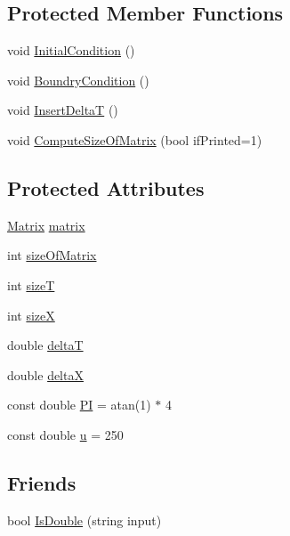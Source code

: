 \subsection*{Protected Member Functions}
\begin{DoxyCompactItemize}
\item 
void \mbox{\hyperlink{class_scheme_ad3546cda995629a2792629a072760ad2}{Initial\+Condition}} ()
\item 
void \mbox{\hyperlink{class_scheme_a36885039937c25f13c8daea654e37b97}{Boundry\+Condition}} ()
\item 
void \mbox{\hyperlink{class_scheme_ac5803e4951dc125b274f543d5037c21d}{Insert\+DeltaT}} ()
\item 
void \mbox{\hyperlink{class_scheme_a0364e328d78e84be15d293a66d946008}{Compute\+Size\+Of\+Matrix}} (bool if\+Printed=1)
\end{DoxyCompactItemize}
\subsection*{Protected Attributes}
\begin{DoxyCompactItemize}
\item 
\mbox{\hyperlink{class_matrix}{Matrix}} \mbox{\hyperlink{class_scheme_a0e1fb8cb7e062d3f49715445a884f0e8}{matrix}}
\item 
int \mbox{\hyperlink{class_scheme_aaa37febfb3b695d7637210b6ffdcd9ad}{size\+Of\+Matrix}}
\item 
int \mbox{\hyperlink{class_scheme_a04f4e41aaa2bffd82b9027550f8374f0}{sizeT}}
\item 
int \mbox{\hyperlink{class_scheme_a34d6e438fa45638221f250c9aa7acde1}{sizeX}}
\item 
double \mbox{\hyperlink{class_scheme_aaaf978f98d30bd96ea56a9387d1b2c5a}{deltaT}}
\item 
double \mbox{\hyperlink{class_scheme_a7491f0ce42370ab44134bf82bd0079a7}{deltaX}}
\item 
const double \mbox{\hyperlink{class_scheme_a1a21e7fac3843f2d64c49597c668ce56}{PI}} = atan(1) $\ast$ 4
\item 
const double \mbox{\hyperlink{class_scheme_a512873bf3cd534832300046f1a1792a3}{u}} = 250
\end{DoxyCompactItemize}
\subsection*{Friends}
\begin{DoxyCompactItemize}
\item 
bool \mbox{\hyperlink{class_scheme_ad9aa7a2eac63a3a91e6efc3d8a8093cd}{Is\+Double}} (string input)
\end{DoxyCompactItemize}


